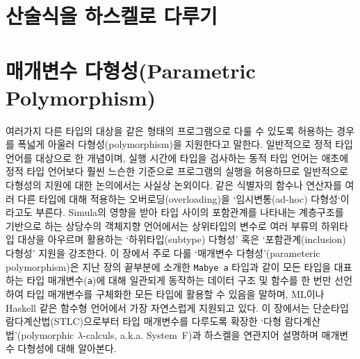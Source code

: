 


\chapter{산술식을 하스켈로 다루기}\label{chap:ArithExpr}




\chapter{매개변수 다형성(Parametric Polymorphism)}\label{chap:ParaPoly}
여러가지 다른 타입의 대상을 같은 형태의 프로그램으로 다룰 수 있도록
허용하는 경우를 폭넓게 아울러 다형성(polymorphism)을 지원한다고 말한다.
일반적으로 정적 타입 언어를 대상으로 한 개념이며, 실행 시간에 타입을
검사하는 동적 타입 언어는 애초에 정적 타입 언어보다 훨씬 느슨한 기준으로
프로그램의 실행을 허용하므로 일반적으로 다형성의 지원에 대한 논의에서는
사실상 논외이다. 같은 식별자의 함수나 연산자를 여러 다른 타입에 대해
적용하는 오버로딩(overloading)을 `임시변통(ad-hoc) 다형성`이라고도 부른다.
Simula의 영향을 받아 타입 사이의 포함관계를 나타내는 계층구조를 기반으로
하는 상당수의 객체지향 언어에서는 상위타입의 변수로 여러 부류의
하위타입 대상을 아우르며 활용하는 `하위타입(subtype) 다형성' 혹은
`포함관계(inclusion) 다형성' 지원을 강조한다. 이 장에서 주로 다룰
`매개변수 다형성'(parameteric polymorphism)은 지난 장의 끝부분에
소개한 \texttt{Mabye a} 타입과 같이 모든 타입을 대표하는
타입 매개변수(\texttt{a})에 대해 일관되게 동작하는 데이터 구조 및 함수를
한 번만 선언하여 타입 매개변수를 구체화한 모든 타입에 활용할 수 있음을 말하며,
ML이나 Haskell 같은 함수형 언어에서 가장 자연스럽게 지원되고 있다.
이 장에서는 단순타입 람다계산법(STLC)으로부터 타입 매개변수를 다루도록
확장한 `다형 람다계산법'(polymorphic $\lambda$-calculs, a.k.a. System~F)과
하스켈을 연관지어 설명하며 매개변수 다형성에 대해 알아본다.

